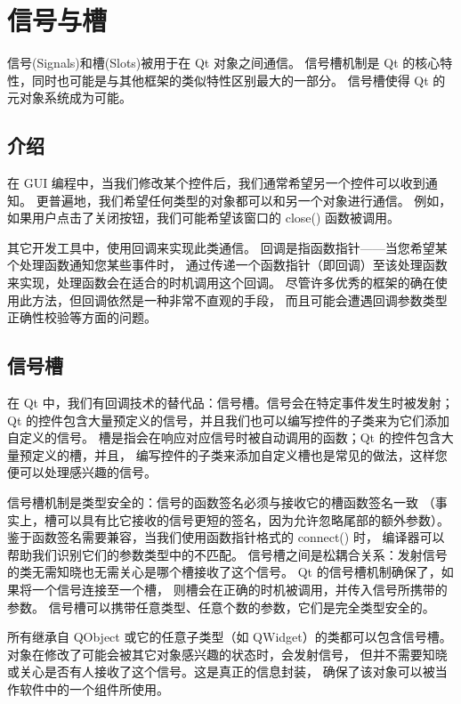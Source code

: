 \chapter{信号与槽}

信号(Signals)和槽(Slots)被用于在 Qt 对象之间通信。
信号槽机制是 Qt 的核心特性，同时也可能是与其他框架的类似特性区别最大的一部分。
信号槽使得 Qt 的元对象系统成为可能。

\section{介绍}

在 GUI 编程中，当我们修改某个控件后，我们通常希望另一个控件可以收到通知。
更普遍地，我们希望任何类型的对象都可以和另一个对象进行通信。
例如，如果用户点击了关闭按钮，我们可能希望该窗口的 close() 函数被调用。

其它开发工具中，使用回调来实现此类通信。
回调是指函数指针——当您希望某个处理函数通知您某些事件时，
通过传递一个函数指针（即回调）至该处理函数来实现，处理函数会在适合的时机调用这个回调。
尽管许多优秀的框架的确在使用此方法，但回调依然是一种非常不直观的手段，
而且可能会遭遇回调参数类型正确性校验等方面的问题。

\section{信号槽}

在 Qt 中，我们有回调技术的替代品：信号槽。信号会在特定事件发生时被发射；
Qt 的控件包含大量预定义的信号，并且我们也可以编写控件的子类来为它们添加自定义的信号。
槽是指会在响应对应信号时被自动调用的函数；Qt 的控件包含大量预定义的槽，并且，
编写控件的子类来添加自定义槽也是常见的做法，这样您便可以处理感兴趣的信号。


信号槽机制是类型安全的：信号的函数签名必须与接收它的槽函数签名一致
（事实上，槽可以具有比它接收的信号更短的签名，因为允许忽略尾部的额外参数）。
鉴于函数签名需要兼容，当我们使用函数指针格式的 connect() 时，
编译器可以帮助我们识别它们的参数类型中的不匹配。
信号槽之间是松耦合关系：发射信号的类无需知晓也无需关心是哪个槽接收了这个信号。
Qt 的信号槽机制确保了，如果将一个信号连接至一个槽，
则槽会在正确的时机被调用，并传入信号所携带的参数。
信号槽可以携带任意类型、任意个数的参数，它们是完全类型安全的。

所有继承自 QObject 或它的任意子类型（如 QWidget）的类都可以包含信号槽。
对象在修改了可能会被其它对象感兴趣的状态时，会发射信号，
但并不需要知晓或关心是否有人接收了这个信号。这是真正的信息封装，
确保了该对象可以被当作软件中的一个组件所使用。

